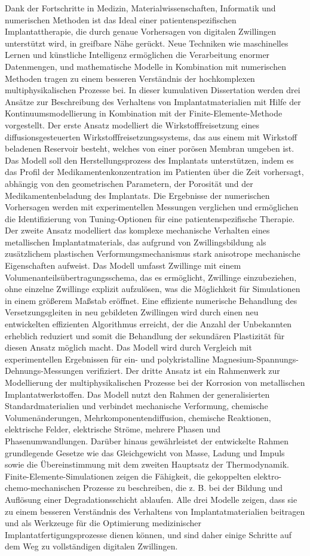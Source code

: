 Dank der Fortschritte in Medizin, Materialwissenschaften, Informatik und numerischen Methoden ist das Ideal einer patientenspezifischen Implantattherapie, die durch genaue Vorhersagen von digitalen Zwillingen unterstützt wird, in greifbare Nähe gerückt. Neue Techniken wie maschinelles Lernen und künstliche Intelligenz ermöglichen die Verarbeitung enormer Datenmengen, und mathematische Modelle in Kombination mit numerischen Methoden tragen zu einem besseren Verständnis der hochkomplexen multiphysikalischen Prozesse bei. In dieser kumulativen Dissertation werden drei Ansätze zur Beschreibung des Verhaltens von Implantatmaterialien mit Hilfe der Kontinuumsmodellierung in Kombination mit der Finite-Elemente-Methode vorgestellt. Der erste Ansatz modelliert die Wirkstofffreisetzung eines diffusionsgesteuerten Wirkstofffreisetzungssystems, das aus einem mit Wirkstoff beladenen Reservoir besteht, welches von einer porösen Membran umgeben ist. Das Modell soll den Herstellungsprozess des Implantats unterstützen, indem es das Profil der Medikamentenkonzentration im Patienten über die Zeit vorhersagt, abhängig von den geometrischen Parametern, der Porosität und der Medikamentenbeladung des Implantats. Die Ergebnisse der numerischen Vorhersagen werden mit experimentellen Messungen verglichen und ermöglichen die Identifizierung von Tuning-Optionen für eine patientenspezifische Therapie. Der zweite Ansatz modelliert das komplexe mechanische Verhalten eines metallischen Implantatmaterials, das aufgrund von Zwillingsbildung als zusätzlichem plastischen Verformungsmechanismus stark anisotrope mechanische Eigenschaften aufweist. Das Modell umfasst Zwillinge mit einem Volumenanteilsübertragungsschema, das es ermöglicht, Zwillinge einzubeziehen, ohne einzelne Zwillinge explizit aufzulösen, was die Möglichkeit für Simulationen in einem größerem Maßstab eröffnet. Eine effiziente numerische Behandlung des Versetzungsgleiten in neu gebildeten Zwillingen wird durch einen neu entwickelten effizienten Algorithmus erreicht, der die Anzahl der Unbekannten erheblich reduziert und somit die Behandlung der sekundären Plastizität für diesen Ansatz möglich macht. Das Modell wird durch Vergleich mit experimentellen Ergebnissen für ein- und polykristalline Magnesium-Spannungs-Dehnungs-Messungen verifiziert. Der dritte Ansatz ist ein Rahmenwerk zur Modellierung der multiphysikalischen Prozesse bei der Korrosion von metallischen Implantatwerkstoffen. Das Modell nutzt den Rahmen der generalisierten Standardmaterialien und verbindet mechanische Verformung, chemische Volumenänderungen, Mehrkomponentendiffusion, chemische Reaktionen, elektrische Felder, elektrische Ströme, mehrere Phasen und Phasenumwandlungen. Darüber hinaus gewährleistet der entwickelte Rahmen grundlegende Gesetze wie das Gleichgewicht von Masse, Ladung und Impuls sowie die Übereinstimmung mit dem zweiten Hauptsatz der Thermodynamik. Finite-Elemente-Simulationen zeigen die Fähigkeit, die gekoppelten elektro-chemo-mechanischen Prozesse zu beschreiben, die z. B. bei der Bildung und Auflösung einer Degradationsschicht ablaufen. Alle drei Modelle zeigen, dass sie zu einem besseren Verständnis des Verhaltens von Implantatmaterialien beitragen und als Werkzeuge für die Optimierung medizinischer Implantatfertigungsprozesse dienen können, und sind daher einige Schritte auf dem Weg zu vollständigen digitalen Zwillingen. 